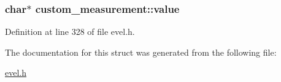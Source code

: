 \subsubsection[{value}]{\setlength{\rightskip}{0pt plus 5cm}char$\ast$ custom\+\_\+measurement\+::value}\label{structcustom__measurement_a298f50c4dd8d508b3a6d6f0aba1ddbaa}


Definition at line 328 of file evel.\+h.



The documentation for this struct was generated from the following file\+:\begin{DoxyCompactItemize}
\item 
\hyperlink{evel_8h}{evel.\+h}\end{DoxyCompactItemize}
